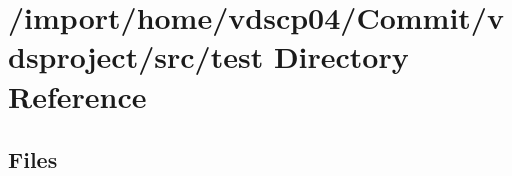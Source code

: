 \section{/import/home/vdscp04/\+Commit/vdsproject/src/test Directory Reference}
\label{dir_120ed4da3e3217b1e7fc0b4f48568e79}
\subsection*{Files}
\begin{DoxyCompactItemize}
\end{DoxyCompactItemize}

